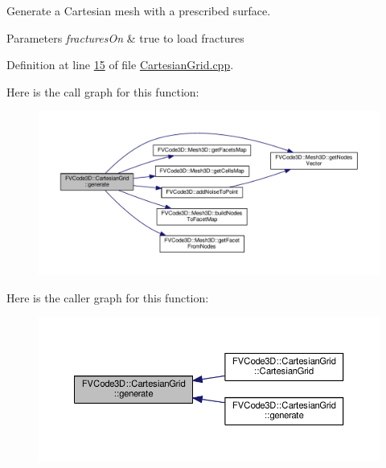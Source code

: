 Generate a Cartesian mesh with a prescribed surface. 


\begin{DoxyParams}{Parameters}
{\em fractures\+On} & true to load fractures \\
\hline
\end{DoxyParams}


Definition at line \hyperlink{CartesianGrid_8cpp_source_l00015}{15} of file \hyperlink{CartesianGrid_8cpp_source}{Cartesian\+Grid.\+cpp}.



Here is the call graph for this function\+:
\nopagebreak
\begin{figure}[H]
\begin{center}
\leavevmode
\includegraphics[width=350pt]{classFVCode3D_1_1CartesianGrid_afdc4d12f34f9bf46db17ec8765e6875f_cgraph}
\end{center}
\end{figure}




Here is the caller graph for this function\+:
\nopagebreak
\begin{figure}[H]
\begin{center}
\leavevmode
\includegraphics[width=350pt]{classFVCode3D_1_1CartesianGrid_afdc4d12f34f9bf46db17ec8765e6875f_icgraph}
\end{center}
\end{figure}


